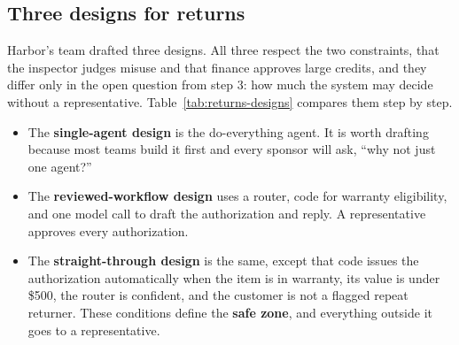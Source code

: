 \subsection{Three designs for returns}
\label{sec:tradeoff}

Harbor's team drafted three designs. All three respect the two constraints, that the inspector judges misuse and that finance approves large credits, and they differ only in the open question from step 3: how much the system may decide without a representative. Table~\ref{tab:returns-designs} compares them step by step.
\begin{itemize}[itemsep=2pt]
  \item The \textbf{single-agent design} is the do-everything agent. It is worth drafting because most teams build it first and every sponsor will ask, ``why not just one agent?''
  \item The \textbf{reviewed-workflow design} uses a router, code for warranty eligibility, and one model call to draft the authorization and reply. A representative approves every authorization.
  \item The \textbf{straight-through design} is the same, except that code issues the authorization automatically when the item is in warranty, its value is under \$500, the router is confident, and the customer is not a flagged repeat returner. These conditions define the \textbf{safe zone}, and everything outside it goes to a representative.
\end{itemize}

